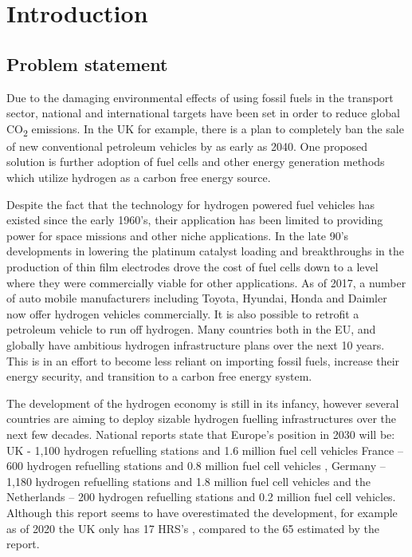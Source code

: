 \chapter{Introduction}
\section{Problem statement}
Due to the damaging environmental effects of using fossil fuels in the transport sector, national and 
international targets have been set in order to reduce global CO\textsubscript{2} emissions.
In the UK for example, there is a plan to completely ban the sale of new conventional petroleum vehicles 
by as early as 2040. 
\cite{DepartmentforEnvironment2017} 
One proposed solution is further adoption of fuel cells and other energy generation methods which utilize
hydrogen as a carbon free energy source. 

Despite the fact that the technology for hydrogen powered fuel vehicles has existed since the early 1960’s, their application has been limited to providing power for space missions and other niche applications. In the late 90’s developments in lowering the platinum catalyst loading and breakthroughs in the production of thin film electrodes drove the cost of fuel cells down to a level where they were commercially viable for other applications. As of 2017, a number of auto mobile manufacturers including Toyota,\cite{Toyota2015} Hyundai, \cite{Hyundai2015} Honda \cite{Honda} and Daimler \cite{Mohrdieck2014} now offer hydrogen vehicles commercially. It is also possible to retrofit a petroleum vehicle to run off hydrogen.\cite{FCell2016} Many countries both in the EU, and globally have ambitious hydrogen infrastructure plans over the next 10 years. This is in an effort to become less reliant on importing fossil fuels, increase their energy security, and transition to a carbon free energy system.

The development of the hydrogen economy is still in its infancy,  however several countries are aiming to deploy sizable hydrogen fuelling infrastructures over the next few decades. National reports state that Europe’s position in 2030 will be: UK - 1,100 hydrogen refuelling stations and 1.6 million fuel cell vehicles \cite{UKH2Mobility2013} France – 600 hydrogen refuelling stations and 0.8 million fuel cell vehicles \cite{Summerton2015}, Germany – 1,180 hydrogen refuelling stations \cite{Hayter2014} and 1.8 million fuel cell vehicles  and the Netherlands – 200 hydrogen refuelling stations and 0.2 million fuel cell vehicles. \cite{Hayter2014} Although this report seems to have overestimated the development, for example as of 2020 the UK only has 17 HRS's \cite{stephen_errity_2020}, compared to the 65 estimated by the report.  

